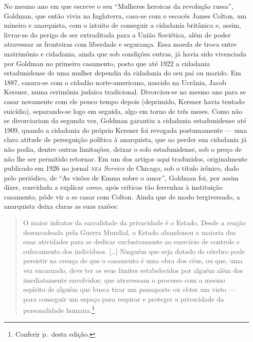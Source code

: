 No mesmo ano em que escreve o seu ``Mulheres heroicas da revolução
russa'', Goldman, que então vivia na Inglaterra, casa-se com o escocês
James Colton, um mineiro e anarquista, com o intuito de conseguir a
cidadania britânica e, assim, livrar-se do perigo de ser
extraditada para a União Soviética, além de poder atravessar as
fronteiras com liberdade e segurança. Essa moeda de troca entre
matrimônio e cidadania, ainda que sob condições outras, já havia sido
vivenciada por Goldman no primeiro casamento, posto que até 1922 a
cidadania estadunidense de uma mulher dependia da cidadania do seu pai
ou marido. Em 1887, casara-se com o cidadão norte-americano, nascido na
Ucrânia, Jacob Kersner, numa cerimônia judaica tradicional.
Divorciou-se no mesmo ano para se casar novamente com ele pouco tempo
depois (deprimido, Kersner havia tentado suicídio), separando-se logo em
seguida, algo em torno de três meses. Como não se divorciariam da
segunda vez, Goldman garantiu a cidadania estadunidense até 1909, quando a cidadania
do próprio Kersner foi revogada postumamente --- uma clara
atitude de perseguição política à anarquista, que ao perder
sua cidadania já não podia, dentre outras limitações,
deixar o solo estadunidense, sob o preço de não lhe ser permitido
retornar. Em um dos artigos aqui traduzidos, originalmente publicado em 1926 no
jornal \emph{\textsc{nea} Service} de Chicago, sob o título irônico, dado
pelo periódico, de ``As visões de Emma sobre o amor'', Goldman foi, por
assim dizer, convidada a explicar \emph{como}, após críticas tão
ferrenhas à instituição casamento, pôde vir a se casar com Colton. Ainda
que de modo tergiversado, a anarquista deixa claras as suas razões:

\begin{quote}
O maior infrator da sacralidade da privacidade é o Estado. Desde a
reação desencadeada pela Guerra Mundial, o Estado abandonou a maioria
das suas atividades para se dedicar exclusivamente ao exercício de
controle e sufocamento dos indivíduos. {[}\ldots{]} Ninguém que seja dotado
de cérebro pode persistir na crença de que o casamento é uma obra dos
céus, ou que, uma vez encarnado, deve ter os seus limites estabelecidos
por alguém além dos imediatamente envolvidos; que atravessam o processo
com o mesmo espírito de alguém que busca tirar um passaporte ou obter um
visto --- para conseguir um espaço para respirar e proteger a privacidade
da personalidade humana.\footnote{Conferir p.\,\pageref{ref3} desta edição.}
\end{quote}

